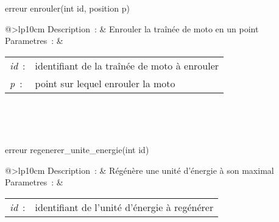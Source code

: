 \begin{minipage}{\linewidth}

\begin{lst-c++}
erreur enrouler(int id, position p)
\end{lst-c++}

\noindent
\begin{tabular}[t]{@{\extracolsep{0pt}}>{\bfseries}lp{10cm}}
Description~: & Enrouler la traînée de moto en un point \\


Parametres~: &
\begin{tabular}[t]{@{\extracolsep{0pt}}ll}
    
    
      
        \textsl{id}~: & identifiant de la traînée de moto à enrouler \\
      
    
      
        \textsl{p}~: & point sur lequel enrouler la moto \\
      
    
  \end{tabular} \\






\end{tabular} \\[0.3cm]
\end{minipage}


\begin{minipage}{\linewidth}

\begin{lst-c++}
erreur regenerer_unite_energie(int id)
\end{lst-c++}

\noindent
\begin{tabular}[t]{@{\extracolsep{0pt}}>{\bfseries}lp{10cm}}
Description~: & Régénère une unité d'énergie à son maximal \\


Parametres~: &
\begin{tabular}[t]{@{\extracolsep{0pt}}ll}
    
    
      
        \textsl{id}~: & identifiant de l'unité d'énergie à regénérer \\
      
    
  \end{tabular} \\






\end{tabular} \\[0.3cm]
\end{minipage}


